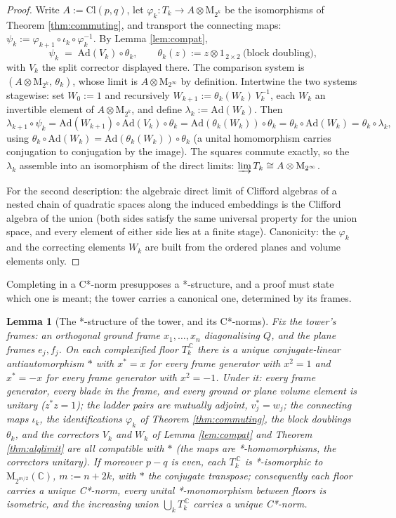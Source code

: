 \documentclass[11pt]{article}
\newtheorem{lemma}[theorem]{Lemma}
\theoremstyle{definition}
\newcommand{\Cl}{\mathrm{Cl}}
\newcommand{\C}{\mathbb{C}}
\newcommand{\Mat}{\mathrm{M}}
\newcommand{\Ad}{\mathrm{Ad}}
\begin{document}
\begin{proof}
Write $A := \Cl(p,q)$, let $\varphi_k : T_k \to A \otimes \Mat_{2^k}$ be the isomorphisms of Theorem \ref{thm:commuting}, and transport the connecting maps: $\psi_k := \varphi_{k+1} \circ \iota_k \circ \varphi_k^{-1}$. By Lemma \ref{lem:compat},
\[
\psi_k \;=\; \Ad(V_k) \circ \theta_k, \qquad \theta_k(z) := z \otimes 1_{\,2 \times 2}\ \text{(block doubling)},
\]
with $V_k$ the split corrector displayed there. The comparison system is $(A \otimes \Mat_{2^k},\, \theta_k)$, whose limit is $A \otimes \Mat_{2^\infty}$ by definition. Intertwine the two systems stagewise: set $W_0 := 1$ and recursively $W_{k+1} := \theta_k(W_k)\, V_k^{-1}$, each $W_k$ an invertible element of $A \otimes \Mat_{2^k}$, and define $\lambda_k := \Ad(W_k)$. Then
\[
\lambda_{k+1} \circ \psi_k = \Ad(W_{k+1}) \circ \Ad(V_k) \circ \theta_k = \Ad(\theta_k(W_k)) \circ \theta_k = \theta_k \circ \Ad(W_k) = \theta_k \circ \lambda_k ,
\]
using $\theta_k \circ \Ad(W_k) = \Ad(\theta_k(W_k)) \circ \theta_k$ (a unital homomorphism carries conjugation to conjugation by the image). The squares commute exactly, so the $\lambda_k$ assemble into an isomorphism of the direct limits: $\varinjlim T_k \cong A \otimes \Mat_{2^\infty}$.

For the second description: the algebraic direct limit of Clifford algebras of a nested chain of quadratic spaces along the induced embeddings is the Clifford algebra of the union (both sides satisfy the same universal property for the union space, and every element of either side lies at a finite stage). Canonicity: the $\varphi_k$ and the correcting elements $W_k$ are built from the ordered planes and volume elements only.
\end{proof}

Completing in a C*-norm presupposes a *-structure, and a proof must state which one is meant; the tower carries a canonical one, determined by its frames.

\begin{lemma}[The *-structure of the tower, and its C*-norms]\label{lem:cstar}
Fix the tower's frames: an orthogonal ground frame $x_1, \dots, x_n$ diagonalising $Q$, and the plane frames $e_j, f_j$. On each complexified floor $T_k^{\,\C}$ there is a unique conjugate-linear antiautomorphism $*$ with $x^* = x$ for every frame generator with $x^2 = 1$ and $x^* = -x$ for every frame generator with $x^2 = -1$. Under it: every frame generator, every blade in the frame, and every ground or plane volume element is unitary ($z^* z = 1$); the ladder pairs are mutually adjoint, $v_j^* = w_j$; the connecting maps $\iota_k$, the identifications $\varphi_k$ of Theorem \ref{thm:commuting}, the block doublings $\theta_k$, and the correctors $V_k$ and $W_k$ of Lemma \ref{lem:compat} and Theorem \ref{thm:alglimit} are all compatible with $*$ (the maps are *-homomorphisms, the correctors unitary). If moreover $p - q$ is even, each $T_k^{\,\C}$ is *-isomorphic to $\Mat_{2^{m/2}}(\C)$, $m := n + 2k$, with $*$ the conjugate transpose; consequently each floor carries a unique C*-norm, every unital *-monomorphism between floors is isometric, and the increasing union $\bigcup_k T_k^{\,\C}$ carries a unique C*-norm.
\end{lemma}
\end{document}
